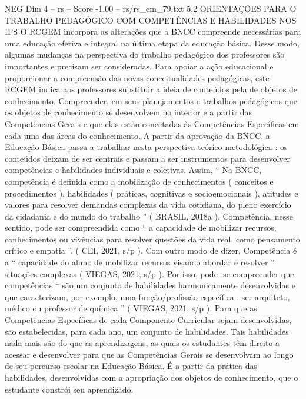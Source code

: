 \begin{textsample}{NEG Dim 4 – rs – Score -1.00 – rs/rs\_em\_79.txt}  \label{ex:f4_neg_197}
5.2 ORIENTAÇÕES PARA O TRABALHO PEDAGÓGICO COM COMPETÊNCIAS E HABILIDADES NOS IFS O RCGEM incorpora as alterações que a BNCC compreende necessárias para uma educação efetiva e integral na última etapa da educação básica.
Desse modo, algumas mudanças na perspectiva do trabalho pedagógico dos professores são importantes e precisam ser consideradas.
Para apoiar a ação educacional e proporcionar a compreensão das novas conceitualidades pedagógicas, este RCGEM indica aos professores substituir a ideia de conteúdos pela de objetos de conhecimento.
Compreender, em seus planejamentos e trabalhos pedagógicos que os objetos de conhecimento se desenvolvem no interior e a partir das Competências Gerais e que elas estão conectadas às Competências Específicas em cada uma das áreas do conhecimento.
A partir da aprovação da BNCC, a Educação Básica passa a trabalhar nesta perspectiva teórico-metodológica : os conteúdos deixam de ser centrais e passam a ser instrumentos para desenvolver competências e habilidades individuais e coletivas.
Assim, “ Na BNCC, competência é definida como a mobilização de conhecimentos ( conceitos e procedimentos ), habilidades ( práticas, cognitivas e socioemocionais ), atitudes e valores para resolver demandas complexas da vida cotidiana, do pleno exercício da cidadania e do mundo do trabalho ” ( BRASIL, 2018a ).
Competência, nesse sentido, pode ser compreendida como “ a capacidade de mobilizar recursos, conhecimentos ou vivências para resolver questões da vida real, como pensamento crítico e empatia ”. ( CEI, 2021, s/p ).
Com outro modo de dizer, Competência é a “ capacidade do aluno de mobilizar recursos visando abordar e resolver ” situações complexas ( VIEGAS, 2021, s/p ).
Por isso, pode -se compreender que competências “ são um conjunto de habilidades harmonicamente desenvolvidas e que caracterizam, por exemplo, uma função/profissão específica : ser arquiteto, médico ou professor de química ” ( VIEGAS, 2021, s/p ).
Para que as Competências Específicas de cada Componente Curricular sejam desenvolvidas, são estabelecidas, para cada ano, um conjunto de habilidades.
Tais habilidades nada mais são do que as aprendizagens, as quais os estudantes têm direito a acessar e desenvolver para que as Competências Gerais se desenvolvam ao longo de seu percurso escolar na Educação Básica.
É a partir da prática das habilidades, desenvolvidas com a apropriação dos objetos de conhecimento, que o estudante constrói seu aprendizado.

\end{textsample}
